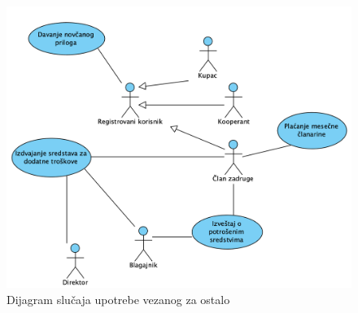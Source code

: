 \documentclass[a4paper, oneside]{article}
\begin{document}

\begin{figure}[h!]
    \centering
    \includegraphics[scale=0.64]{images/dslucup_ostalo.png}
    \caption{Dijagram slučaja upotrebe vezanog za ostalo}
    \label{dslucup_ostalo}
\end{figure}

\clearpage
\end{document}
